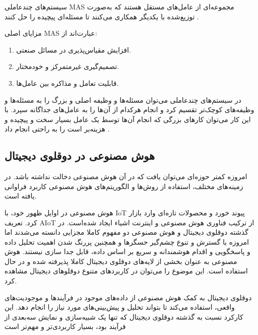 سیستم‌های چندعاملی \gls{MAS} مجموعه‌ای از عامل‌های مستقل هستند که به‌صورت توزیع‌شده با یکدیگر همکاری می‌کنند تا مسئله‌ای پیچیده را حل کنند \cite{dorri2018multiagent,bellifemine2007jade}. 

مزایای اصلی \gls{MAS} عبارت‌اند از:
\begin{enumerate}
	\item افزایش مقیاس‌پذیری در مسائل صنعتی.
	\item تصمیم‌گیری غیرمتمرکز و خودمختار.
	\item قابلیت تعامل و مذاکره بین عامل‌ها.
\end{enumerate}


در سیستم‌های چندعاملی می‌توان مسئله‌ها و وظیفه اصلی و بزرگ را به مسئله‌ها و وظیفه‌های کوچک‌تر تقسیم کرد و انجام هرکدام از آن‌ها را به عامل‌های جداگانه سپرد. با این کار می‌توان کارهای بزرگی که انجام آن‌ها توسط یک عامل بسیار سخت و پیچیده  و هزینه‌بر است را به راحتی انجام داد \cite{dorri2018multiagent}.



\subsection{هوش مصنوعی در دوقلوی دیجیتال}

امروزه کمتر حوزه‌ای می‌توان یافت که در آن هوش مصنوعی دخالت نداشته‌ باشد. در زمینه‌های مختلف، استفاده از روش‌ها و الگوریتم‌های هوش مصنوعی کاربرد فراوانی یافته است. 

هوش مصنوعی در اوایل ظهور خود، با
\gls{IoT}
پیوند خورد و محصولات تازه‌ای وارد بازار کرد. تعریف 
\gls{AIoT}
از ترکیب فناوری هوش مصنوعی و اینترنت اشیاء ایجاد شده‌است. در گذشته دوقلوی دیجیتال و هوش مصنوعی دو مفهوم کاملا مجزایی دانسته می‌شدند اما امروزه با گسترش و تنوع چشم‌گیر حسگر‌ها و همچنین پررنگ شدن اهمیت تحلیل داده‌ و پاسخگویی و اقدام هوشمندانه و سریع بر اساس داده، قابل جدا سازی نیستند. هوش مصنوعی به عنوان بخشی از لایه‌های دوقلوی دیجیتال کاملا پذیرفته شده و در حال استفاده است. این موضوع را می‌توان در کاربرد‌های متنوع دوقلو‌های دیجیتال مشاهده کرد.

دوقلوی دیجیتال به کمک هوش مصنوعی از داده‌های موجود در فرآیندها و موجودیت‌های واقعی، استفاده می‌کند تا بتواند تحلیل و پیش‌بینی‌های مورد نیاز را انجام دهد. این کارکرد نسبت به گذشته دوقلوی دیجیتال که تنها یک شبیه‌سازی و نمایش سه‌بعدی از فرآیند بود، بسیار کاربردی‌تر و مهم‌تر است \cite{rozbahani2023design}


